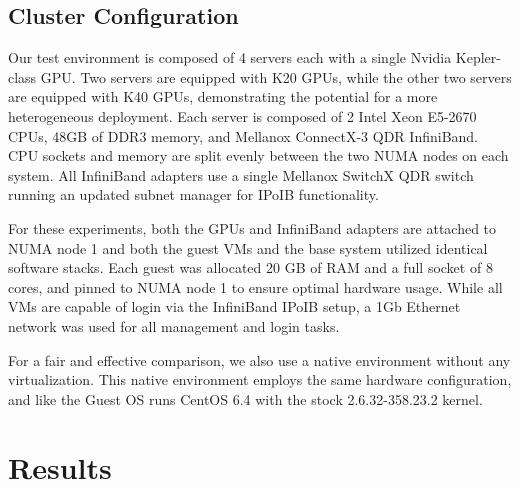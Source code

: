 \documentclass{sigplanconf}
\begin{document}
\subsection{Cluster Configuration}

Our test environment is composed of 4 servers each with a single Nvidia Kepler-class GPU.  Two servers are equipped with K20 GPUs, while the other two servers are equipped with K40 GPUs, demonstrating the potential for a more heterogeneous deployment.  Each server is composed of 2 Intel Xeon E5-2670 CPUs, 48GB of DDR3 memory, and Mellanox ConnectX-3 QDR InfiniBand.  CPU sockets and memory are split evenly between the two NUMA nodes on each system. All InfiniBand adapters use a single Mellanox SwitchX QDR switch running an updated subnet manager for IPoIB functionality.   


For these experiments, both the GPUs and InfiniBand adapters are attached to NUMA node 1 and both the guest VMs and the base system utilized identical software stacks.  Each guest was allocated 20 GB of RAM and a full socket of 8 cores, and pinned to NUMA node 1 to ensure optimal hardware usage. While all VMs are capable of login via the InfiniBand IPoIB setup, a 1Gb Ethernet network was used for all management and login tasks.  


For a fair and effective comparison, we also use a native environment without any virtualization. This native environment employs the same hardware configuration, and like the Guest OS runs CentOS 6.4 with the stock 2.6.32-358.23.2 kernel. 


 
\section{Results}
\end{document}
